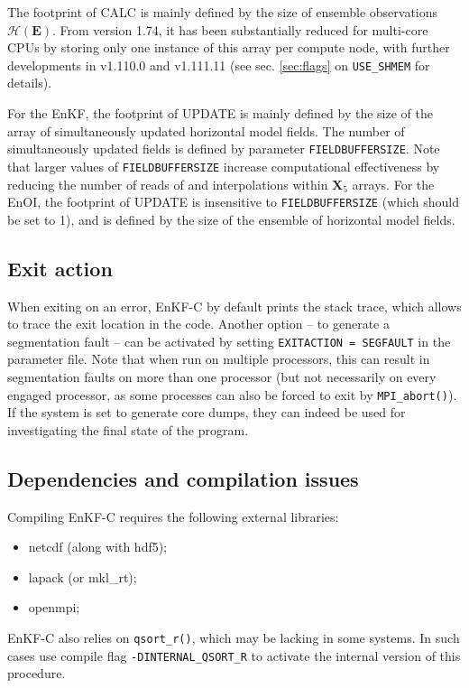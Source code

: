 \documentclass[11pt]{report}
\newcommand{\mb} {\mathbf}
\begin{document}
The footprint of CALC is mainly defined by the size of ensemble observations $\mathcal H(\mb E)$.
From version 1.74, it has been substantially reduced for multi-core CPUs by storing only one instance of this array per compute node, with further developments in v1.110.0 and v1.111.11 (see sec. \ref{sec:flags} on \verb|USE_SHMEM| for details).

For the EnKF, the footprint of UPDATE is mainly defined by the size of the array of simultaneously updated horizontal model fields.
The number of simultaneously updated fields is defined by parameter \verb|FIELDBUFFERSIZE|.
Note that larger values of \verb|FIELDBUFFERSIZE| increase computational effectiveness by reducing the number of reads of and interpolations within $\mb X_5$ arrays.
For the EnOI, the footprint of UPDATE is insensitive to \verb|FIELDBUFFERSIZE| (which should be set to 1), and is defined by the size of the ensemble of horizontal model fields.

\subsection{Exit action}

When exiting on an error, EnKF-C by default prints the stack trace, which allows to trace the exit location in the code.
Another option -- to generate a segmentation fault -- can be activated by setting \verb|EXITACTION = SEGFAULT| in the parameter file.
Note that when run on multiple processors, this can result in segmentation faults on more than one processor (but not necessarily on every engaged processor, as some processes can also be forced to exit by \verb|MPI_abort()|).
If the system is set to generate core dumps, they can indeed be used for investigating the final state of the program.

\subsection{Dependencies and compilation issues}

Compiling EnKF-C requires the following external libraries:
\begin{itemize}
\item netcdf (along with hdf5);
\item lapack (or mkl\_rt);
\item openmpi;
\end{itemize}

EnKF-C also relies on \verb|qsort_r()|, which may be lacking in some systems.
In such cases use compile flag \verb|-DINTERNAL_QSORT_R| to activate the internal version of this procedure.
\end{document}
